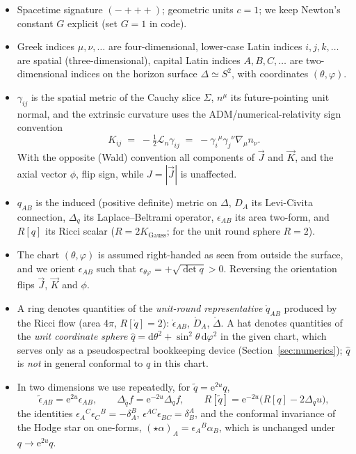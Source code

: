 \documentclass[11pt]{article}
\newcommand{\dd}{\mathrm{d}}
\newcommand{\ee}{\mathrm{e}}
\newcommand{\Lie}{\mathcal{L}}
\newcommand{\qo}{\mathring{q}}          %
\newcommand{\epso}{\mathring{\epsilon}} %
\newcommand{\Do}{\mathring{D}}          %
\newcommand{\Lapo}{\mathring{\Delta}}   %
\newcommand{\vJ}{\vec{J}}
\newcommand{\vK}{\vec{K}}
\begin{document}
\begin{itemize}
\item Spacetime signature $({-}{+}{+}{+})$; geometric units $c=1$; we keep
  Newton's constant $G$ explicit (set $G=1$ in code).
\item Greek indices $\mu,\nu,\dots$ are four-dimensional, lower-case Latin
  indices $i,j,k,\dots$ are spatial (three-dimensional), capital Latin indices
  $A,B,C,\dots$ are two-dimensional indices on the horizon surface
  $\Delta\simeq S^2$, with coordinates $(\theta,\varphi)$.
\item $\gamma_{ij}$ is the spatial metric of the Cauchy slice $\Sigma$,
  $n^\mu$ its future-pointing unit normal, and the extrinsic curvature uses
  the ADM/numerical-relativity sign convention
  \begin{equation}
    K_{ij} \;=\; -\tfrac12 \Lie_n \gamma_{ij}
            \;=\; -\gamma_i{}^\mu \gamma_j{}^\nu \nabla_\mu n_\nu .
    \label{eq:Kconvention}
  \end{equation}
  With the opposite (Wald) convention all components of $\vJ$ and $\vK$, and
  the axial vector $\phi$, flip sign, while $J=|\vJ|$ is unaffected.
\item $q_{AB}$ is the induced (positive definite) metric on $\Delta$, $D_A$
  its Levi-Civita connection, $\Delta_q$ its Laplace--Beltrami operator,
  $\epsilon_{AB}$ its area two-form, and $R[q]$ its Ricci scalar
  ($R=2K_{\mathrm{Gauss}}$; for the unit round sphere $R=2$).
\item The chart $(\theta,\varphi)$ is assumed right-handed as seen from
  outside the surface, and we orient $\epsilon_{AB}$ such that
  $\epsilon_{\theta\varphi}=+\sqrt{\det q}>0$.  Reversing the orientation
  flips $\vJ$, $\vK$ and $\phi$.
\item A ring denotes quantities of the \emph{unit-round representative}
  $\qo_{AB}$ produced by the Ricci flow (area $4\pi$, $R[\qo]=2$):
  $\epso_{AB}$, $\Do_A$, $\Lapo$.  A hat denotes quantities of the
  \emph{unit coordinate sphere} $\hat q = \dd\theta^2 +
  \sin^2\!\theta\,\dd\varphi^2$ in the given chart, which serves only as a
  pseudospectral bookkeeping device (Section~\ref{sec:numerics}); $\hat q$ is
  \emph{not} in general conformal to $q$ in this chart.
\item In two dimensions we use repeatedly, for $\tilde q = \ee^{2u} q$,
  \begin{equation}
    \tilde\epsilon_{AB} = \ee^{2u}\epsilon_{AB},\qquad
    \Delta_{\tilde q} f = \ee^{-2u}\Delta_q f,\qquad
    R[\tilde q] = \ee^{-2u}\bigl(R[q] - 2\Delta_q u\bigr),
    \label{eq:confidentities}
  \end{equation}
  the identities $\epsilon_A{}^C \epsilon_C{}^B = -\delta_A^B$,
  $\epsilon^{AC}\epsilon_{BC} = \delta^A_B$, and the conformal invariance of
  the Hodge star on one-forms, $(\star\alpha)_A = \epsilon_A{}^B \alpha_B$,
  which is unchanged under $q \to \ee^{2u} q$.
\end{itemize}
\end{document}
